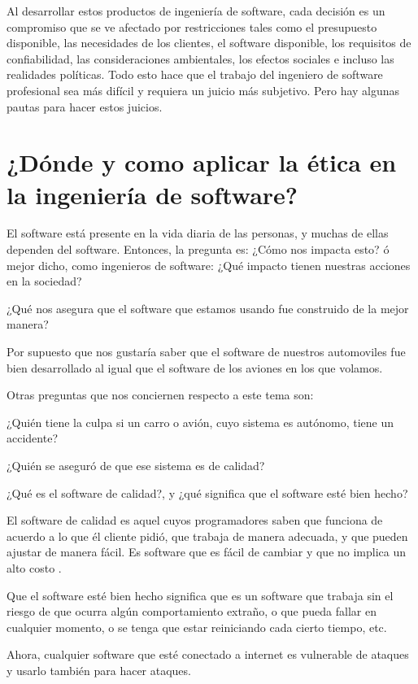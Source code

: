 \documentclass[twoside]{article}
\begin{document}
\begin{multicols}{2}
Al desarrollar estos productos de ingeniería de software, cada decisión es un
compromiso que se ve afectado por restricciones tales como el presupuesto
disponible, las necesidades de los clientes, el software disponible, los
requisitos de confiabilidad, las consideraciones ambientales, los efectos
sociales e incluso las realidades políticas. Todo esto hace que el trabajo del
ingeniero de software profesional sea más difícil y requiera un juicio más
subjetivo. Pero hay algunas pautas para hacer estos juicios.

\section{¿Dónde y como aplicar la ética en la ingeniería de software?}

El software está presente en la vida diaria de las personas, y muchas de ellas
dependen del software. Entonces, la pregunta es: ¿Cómo nos impacta esto? ó mejor
dicho, como ingenieros de software: ¿Qué impacto tienen nuestras acciones en la
sociedad?

¿Qué nos asegura que el software que estamos usando fue construido de la mejor
manera?

Por supuesto que nos gustaría saber que el software de nuestros automoviles fue
bien desarrollado al igual que el software de los aviones en los que volamos.

Otras preguntas que nos conciernen respecto a este tema son:

¿Quién tiene la culpa si un carro o avión, cuyo sistema es autónomo, tiene un
accidente?

¿Quién se aseguró de que ese sistema es de calidad?

¿Qué es el software de calidad?, y ¿qué significa que el software esté bien hecho?

El software de calidad es aquel cuyos programadores saben que funciona de
acuerdo a lo que él cliente pidió, que trabaja de manera adecuada, y que pueden
ajustar de manera fácil. Es software que es fácil de cambiar y que no implica un
alto costo \cite{CMartin2022EthicsManifesto}.

Que el software esté bien hecho significa que es un software que trabaja sin el
riesgo de que ocurra algún comportamiento extraño, o que pueda fallar en
cualquier momento, o se tenga que estar reiniciando cada cierto tiempo, etc.

Ahora, cualquier software que esté conectado a internet es vulnerable de ataques
y usarlo también para hacer ataques.


\end{multicols}
\end{document}
